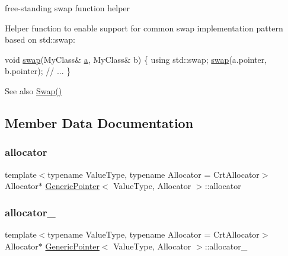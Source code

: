free-\/standing swap function helper 

Helper function to enable support for common swap implementation pattern based on {\ttfamily std\+::swap\+:} 
\begin{DoxyCode}
\textcolor{keywordtype}{void} \hyperlink{classGenericPointer_a249c61b5d4bed20c3f8972c57f46a937}{swap}(MyClass& \hyperlink{pointer_8h_aeeddce917cf130d62c370b8f216026dd}{a}, MyClass& b) \{
    \textcolor{keyword}{using} std::swap;
    \hyperlink{classGenericPointer_a249c61b5d4bed20c3f8972c57f46a937}{swap}(a.pointer, b.pointer);
    \textcolor{comment}{// ...}
\}
\end{DoxyCode}
 \begin{DoxySeeAlso}{See also}
\hyperlink{classGenericPointer_a64fd102622f772efefd445cbed56b16e}{Swap()} 
\end{DoxySeeAlso}


\subsection{Member Data Documentation}
\mbox{\label{classGenericPointer_aeb61ba8e67260b43090791eeca8b90e0}} 
\subsubsection{\texorpdfstring{allocator}{allocator}}
{\footnotesize\ttfamily template$<$typename Value\+Type, typename Allocator = Crt\+Allocator$>$ \\
Allocator$\ast$ \hyperlink{classGenericPointer}{Generic\+Pointer}$<$ Value\+Type, Allocator $>$\+::allocator}

\mbox{\label{classGenericPointer_a331cffeec161b80ea18ac3f1562851bf}} 
\subsubsection{\texorpdfstring{allocator\+\_\+}{allocator\_}}
{\footnotesize\ttfamily template$<$typename Value\+Type, typename Allocator = Crt\+Allocator$>$ \\
Allocator$\ast$ \hyperlink{classGenericPointer}{Generic\+Pointer}$<$ Value\+Type, Allocator $>$\+::allocator\+\_\+}



